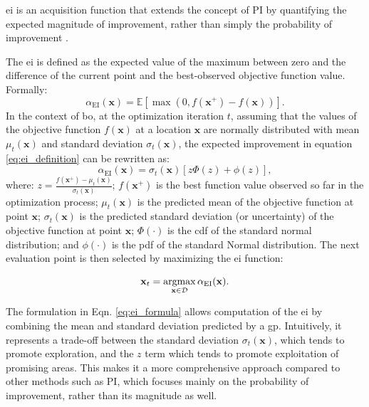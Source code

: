 \acf{ei} is an acquisition function that extends the concept of \ac{PI} by quantifying the expected magnitude of improvement, rather than simply the probability of improvement \citep{mockus1978application, jones1998efficient}. 

The \ac{ei} is defined as the expected value of the maximum between zero and the difference of the current point and the best-observed objective function value. Formally:
\begin{equation*}
\alpha_{\text{EI}}(\mathbf{x}) = \mathbb{E} [\max(0, f(\mathbf{x}^+) - f(\mathbf{x}))].
\label{eq:ei_definition}
\end{equation*}
In the context of \ac{bo}, at the optimization iteration $t$, assuming that the values of the objective function \(f(\mathbf{x})\) at a location \(\mathbf{x}\) are normally distributed with mean \(\mu_t(\mathbf{x})\) and standard deviation \(\sigma_t(\mathbf{x})\), the expected improvement in equation \eqref{eq:ei_definition} can be rewritten as:
\begin{equation*}
    \alpha_{\text{EI}}(\mathbf{x}) = \sigma_t(\mathbf{x}) [ z \Phi(z) + \phi(z) ],
    \label{eq:ei_formula}
\end{equation*}
where: \(z =  \frac{f(\mathbf{x}^+) - \mu_t(\mathbf{x})}{\sigma_t(\mathbf{x})}\); \(f(\mathbf{x}^+)\) is the best function value observed so far in the optimization process; \(\mu_t(\mathbf{x})\) is the predicted mean of the objective function at point \(\mathbf{x}\); \(\sigma_t(\mathbf{x})\) is the predicted standard deviation (or uncertainty) of the objective function at point \(\mathbf{x}\); \(\Phi(\cdot)\) is the \ac{cdf} of the standard normal distribution; and \(\phi(\cdot)\) is the \ac{pdf} of the standard Normal distribution. The next evaluation point is then selected by maximizing the \ac{ei} function:

\[
\mathbf{x}_t = \operatorname*{argmax}_{\mathbf{x} \in \mathcal{D}}  \alpha_{\text{EI}}(\mathbf{x}).
\]

The formulation in Eqn. \eqref{eq:ei_formula} allows computation of the \ac{ei} by combining the mean and standard deviation predicted by a \ac{gp}. Intuitively, it represents a trade-off between the standard deviation \(\sigma_t(\mathbf{x})\), which tends to promote exploration, and the \(z\) term which tends to promote exploitation of promising areas. This makes it a more comprehensive approach compared to other methods such as \ac{PI}, which focuses mainly on the probability of improvement, rather than its magnitude as well.

